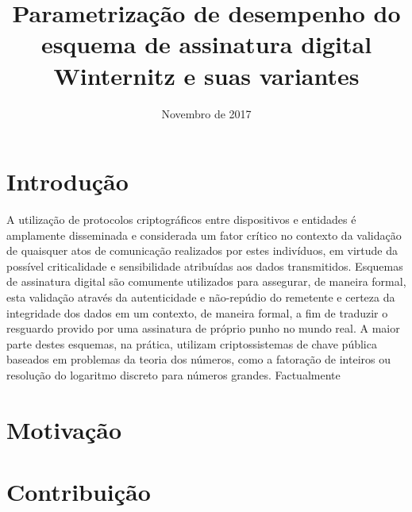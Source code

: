 \documentclass{article}
\title{Parametrização de desempenho do esquema de
assinatura digital Winternitz e suas variantes}
\author{Novembro de 2017}
\date{}
\begin{document}
\maketitle

\section{Introdução}

A utilização de protocolos criptográficos entre dispositivos e entidades
é amplamente disseminada e considerada um fator crítico no contexto da
validação de quaisquer atos de comunicação realizados por estes indivíduos,
em virtude da possível criticalidade e sensibilidade atribuídas aos dados
transmitidos. Esquemas de assinatura digital são comumente utilizados para
assegurar, de maneira formal, esta validação através da autenticidade e
não-repúdio do remetente e certeza da integridade dos dados em um contexto,
de maneira formal, a fim de traduzir o resguardo provido por uma assinatura
de próprio punho no mundo real. A maior parte destes esquemas, na prática,
utilizam criptossistemas de chave pública baseados em problemas da teoria
dos números, como a fatoração de inteiros ou resolução do logaritmo discreto
para números grandes. Factualmente

\section{Motivação}

\section{Contribuição}

\end{document}

